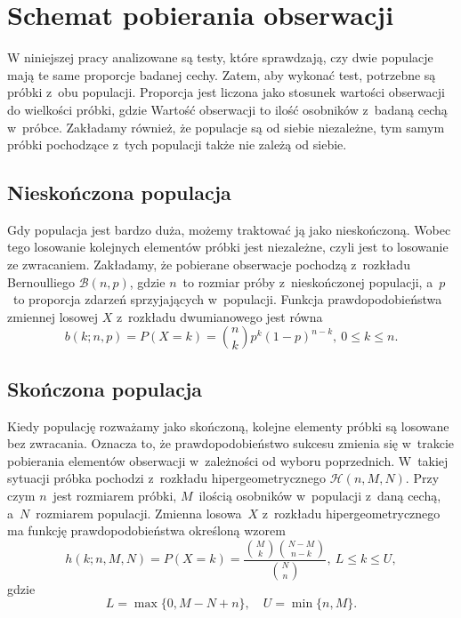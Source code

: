 \chapter{Schemat pobierania obserwacji}

W niniejszej pracy analizowane są testy, które sprawdzają, czy dwie populacje mają te same proporcje badanej cechy. Zatem, aby wykonać test, potrzebne są próbki z~obu populacji. Proporcja jest liczona jako stosunek wartości obserwacji do wielkości próbki, gdzie Wartość obserwacji to ilość osobników z~badaną cechą w~próbce. Zakładamy również, że populacje są od siebie niezależne, tym samym próbki pochodzące z~tych populacji także nie zależą od siebie. 


\section{Nieskończona populacja}
Gdy populacja jest bardzo duża, możemy traktować ją jako nieskończoną. Wobec tego losowanie kolejnych elementów próbki jest niezależne, czyli jest to losowanie ze zwracaniem. Zakładamy, że pobierane obserwacje pochodzą z~rozkładu Bernoulliego $\mathcal{B}(n,p)$, gdzie $n$~to rozmiar próby z~nieskończonej populacji, a~$p$~to proporcja zdarzeń sprzyjających w~populacji. Funkcja prawdopodobieństwa zmiennej losowej $X$ z~rozkładu dwumianowego jest równa
\begin{equation}
b(k;n,p) = P(X=k) = \binom{n}{k} p^k (1-p)^{n-k},\ 0\leq k\leq n.
\end{equation}

\section{Skończona populacja}
\label{r1:skonczonapopulacja}
Kiedy populację rozważamy jako skończoną, kolejne elementy próbki są losowane bez zwracania. Oznacza to, że prawdopodobieństwo sukcesu zmienia się w~trakcie pobierania elementów obserwacji w~zależności od wyboru poprzednich. W~takiej sytuacji próbka pochodzi z~rozkładu hipergeometrycznego $\mathcal{H}(n,M,N)$. Przy czym $n$~jest rozmiarem próbki, $M$~ilością osobników w~populacji z~daną cechą, a~$N$~rozmiarem populacji. Zmienna losowa~$X$ z~rozkładu hipergeometrycznego ma funkcję prawdopodobieństwa określoną wzorem
\begin{equation}
\label{hg}
h(k;n,M,N) = P(X=k) = \frac{\binom{M}{k} \binom{N-M}{n-k}}{\binom{N}{n}},\ L\leq k\leq U,
\end{equation}
gdzie
\begin{equation}
\label{ograniczenia}
L=\max\{0,M-N+n\},\quad U=\min\{n,M\}.
\end{equation}

